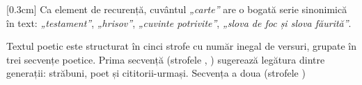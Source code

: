 \documentclass[
12pt,
a4paper
]{article}
\newcommand{\rom}[1]{\uppercase\expandafter{\romannumeral #1\relax}} %
\begin{document}
[0.3cm]
Ca element de recurență, cuvântul \textit{„carte”} are o bogată serie sinonimică în text: \textit{„testament”}, \textit{„hrisov”}, \textit{„cuvinte potrivite”}, \textit{„slova de foc și slova făurită”}.

Textul poetic este structurat în cinci strofe cu număr inegal de versuri, grupate în trei secvențe poetice. Prima secvență (strofele \rom{1}, \rom{2}) sugerează legătura dintre generații: străbuni, poet și cititorii-urmași. Secvența a doua (strofele \rom{3})
\end{document}
